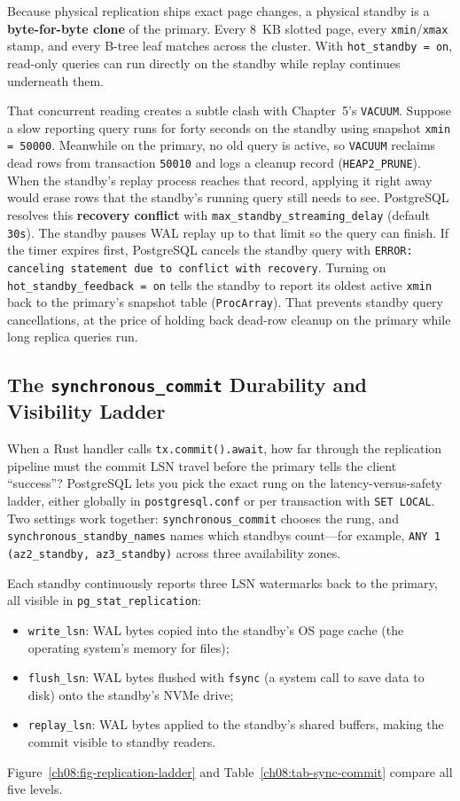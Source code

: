 Because physical replication ships exact page changes, a physical standby is a
\textbf{byte-for-byte clone} of the primary. Every 8~KB slotted page, every
\texttt{xmin}/\texttt{xmax} stamp, and every B-tree leaf matches across the
cluster. With \texttt{hot\_standby = on}, read-only queries can run directly on the
standby while replay continues underneath them.

That concurrent reading creates a subtle clash with Chapter~5's \texttt{VACUUM}.
Suppose a slow reporting query runs for forty seconds on the standby using snapshot
\texttt{xmin = 50000}. Meanwhile on the primary, no old query is active, so
\texttt{VACUUM} reclaims dead rows from transaction \texttt{50010} and logs a
cleanup record (\texttt{HEAP2\_PRUNE}). When the standby's replay process reaches
that record, applying it right away would erase rows that the standby's running
query still needs to see. PostgreSQL resolves this \textbf{recovery conflict} with
\texttt{max\_standby\_streaming\_delay} (default \texttt{30s}). The standby pauses
WAL replay up to that limit so the query can finish. If the timer expires first,
PostgreSQL cancels the standby query with \texttt{ERROR: canceling statement due to
conflict with recovery}. Turning on \texttt{hot\_standby\_feedback = on} tells the
standby to report its oldest active \texttt{xmin} back to the primary's snapshot
table (\texttt{ProcArray}). That prevents standby query cancellations, at the price
of holding back dead-row cleanup on the primary while long replica queries run.

\subsection{The \texttt{synchronous\_commit} Durability and Visibility Ladder}
\label{ch08:sync-commit-ladder}

When a Rust handler calls \texttt{tx.commit().await}, how far through the
replication pipeline must the commit LSN travel before the primary tells the client
``success''? PostgreSQL lets you pick the exact rung on the latency-versus-safety
ladder, either globally in \texttt{postgresql.conf} or per transaction with
\texttt{SET LOCAL}. Two settings work together: \texttt{synchronous\_commit} chooses
the rung, and \texttt{synchronous\_standby\_names} names which standbys count---for
example, \texttt{ANY 1 (az2\_standby, az3\_standby)} across three availability
zones.

Each standby continuously reports three LSN watermarks back to the primary, all
visible in \texttt{pg\_stat\_replication}:
\begin{itemize}
  \item \texttt{write\_lsn}: WAL bytes copied into the standby's OS page cache (the operating system's memory for files);
  \item \texttt{flush\_lsn}: WAL bytes flushed with \texttt{fsync} (a system call to save data to disk) onto the
    standby's NVMe drive;
  \item \texttt{replay\_lsn}: WAL bytes applied to the standby's shared buffers,
    making the commit visible to standby readers.
\end{itemize}
Figure~\ref{ch08:fig-replication-ladder} and
Table~\ref{ch08:tab-sync-commit} compare all five levels.

